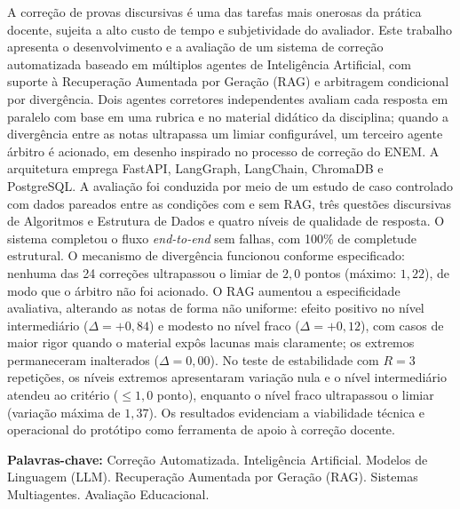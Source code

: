 \begin{resumo}

A correção de provas discursivas é uma das tarefas mais onerosas da prática docente, sujeita a alto custo de tempo e subjetividade do avaliador. Este trabalho apresenta o desenvolvimento e a avaliação de um sistema de correção automatizada baseado em múltiplos agentes de Inteligência Artificial, com suporte à Recuperação Aumentada por Geração (RAG) e arbitragem condicional por divergência. Dois agentes corretores independentes avaliam cada resposta em paralelo com base em uma rubrica e no material didático da disciplina; quando a divergência entre as notas ultrapassa um limiar configurável, um terceiro agente árbitro é acionado, em desenho inspirado no processo de correção do ENEM. A arquitetura emprega FastAPI, LangGraph, LangChain, ChromaDB e PostgreSQL. A avaliação foi conduzida por meio de um estudo de caso controlado com dados pareados entre as condições com e sem RAG, três questões discursivas de Algoritmos e Estrutura de Dados e quatro níveis de qualidade de resposta. O sistema completou o fluxo \textit{end-to-end} sem falhas, com 100\% de completude estrutural. O mecanismo de divergência funcionou conforme especificado: nenhuma das 24 correções ultrapassou o limiar de $2{,}0$ pontos (máximo: $1{,}22$), de modo que o árbitro não foi acionado. O RAG aumentou a especificidade avaliativa, alterando as notas de forma não uniforme: efeito positivo no nível intermediário ($\Delta = +0{,}84$) e modesto no nível fraco ($\Delta = +0{,}12$), com casos de maior rigor quando o material expôs lacunas mais claramente; os extremos permaneceram inalterados ($\Delta = 0{,}00$). No teste de estabilidade com $R=3$ repetições, os níveis extremos apresentaram variação nula e o nível intermediário atendeu ao critério ($\leq 1{,}0$ ponto), enquanto o nível fraco ultrapassou o limiar (variação máxima de $1{,}37$). Os resultados evidenciam a viabilidade técnica e operacional do protótipo como ferramenta de apoio à correção docente.

\textbf{Palavras-chave:} Correção Automatizada. Inteligência Artificial. Modelos de Linguagem (LLM). Recuperação Aumentada por Geração (RAG). Sistemas Multiagentes. Avaliação Educacional.

\end{resumo}
